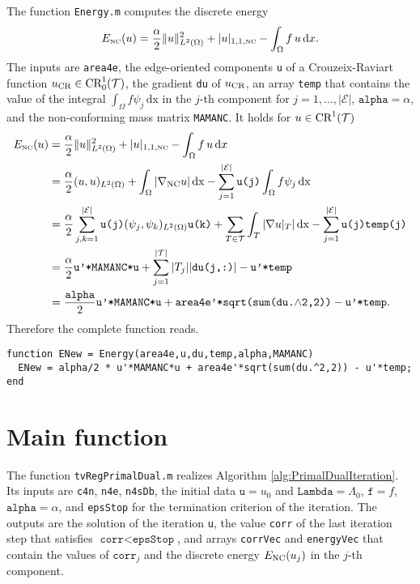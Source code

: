 The function \texttt{Energy.m} computes the discrete energy
\begin{align*}
  E_{\textup{\tiny NC}} (u) 
  &=    
  \frac{\alpha}{2}   \|  u \|_{L^2(\Omega)}^2 
  + | u |_{1,1,{\textup{\tiny NC}} }  -\int_\Omega f\,  u \,\mathrm dx. \\
\end{align*}
The inputs are
\texttt{area4e},
the edge-oriented components \texttt{u} of a Crouzeix-Raviart function $u_{\textup{CR}}
\in \textup{CR}^1_0(\mathcal T)$, the gradient \texttt{du} of $u_{\textup{CR}}$, 
an array \texttt{temp} that contains the value of the integral
$
\int_{\Omega} f\psi_j\,\mathrm{dx} 
$
in the $j$-th component for $j=1,\dots,|\mathcal E|$,
$\texttt{alpha}=\alpha$,
and the non-conforming mass matrix \texttt{MAMANC}.
It holds for $u\in\textup{CR}^1(\mathcal T)$
\begin{align*}
  E_{\textup{\tiny NC}} (u) 
  &=    
  \frac{\alpha}{2}   \|  u \|_{L^2(\Omega)}^2 
  + | u |_{1,1,{\textup{\tiny NC}} }  -\int_\Omega f\,  u \,\mathrm dx \\
  &=
  \frac{\alpha}{2} (u,u)_{L^2(\Omega)} 
  + \int_\Omega |\nabla_{\textup{NC}}u|\,\mathrm{dx} 
  - \sum_{j=1}^{|\mathcal E|}\texttt{u(j)} \int_\Omega f\psi_j\,\mathrm{dx} \\
  &= 
  \frac{\alpha}{2} 
  \sum_{j,k=1}^{|\mathcal E|}\texttt{u(j)}(\psi_j,\psi_k)_{L^2(\Omega)}\texttt{u(k)}
  + \sum_{T \in \mathcal T}\int_T |\nabla u|_T| \,\mathrm{dx} 
  - \sum_{j=1}^{|\mathcal E|}\texttt{u(j)} \texttt{temp(j)} \\
  &= 
  \frac{\alpha}{2} 
  \texttt{u'*MAMANC*u}
  + \sum_{j=1}^{|\mathcal T|}|T_j||\texttt{du(j,:)}|
  - \texttt{u'*temp}\\
  &=
  \frac{\texttt{alpha}}{2} \texttt{u'*MAMANC*u}
  + \texttt{area4e'*sqrt(sum(du.$\wedge$2,2))}
  - \texttt{u'*temp}.
\end{align*}
Therefore the complete function reads.
\begin{lstlisting}[frame=single,numbers=none]
function ENew = Energy(area4e,u,du,temp,alpha,MAMANC)
  ENew = alpha/2 * u'*MAMANC*u + area4e'*sqrt(sum(du.^2,2)) - u'*temp;
end
\end{lstlisting}


\section{Main function}\label{fct:tvRegPrimalDual}

The function \texttt{tvRegPrimalDual.m} realizes Algorithm \ref{alg:PrimalDualIteration}.
Its inputs are \texttt{c4n}, \texttt{n4e}, \texttt{n4sDb}, the initial data 
$\texttt{u}=u_0$ and $\texttt{Lambda}=\Lambda_0$, 
$\texttt{f}=f$, $\texttt{alpha}=\alpha$, and \texttt{epsStop} for the termination criterion
of the iteration. The outputs are the solution of the iteration \texttt{u}, 
the value \texttt{corr} of the last iteration step that satisfies $\texttt{corr}<\texttt{epsStop}$,
and arrays \texttt{corrVec} and \texttt{energyVec} that contain the values of $\texttt{corr}_j$
and the discrete energy $E_{\textup{NC}}(u_j)$ in the $j$-th component. 

